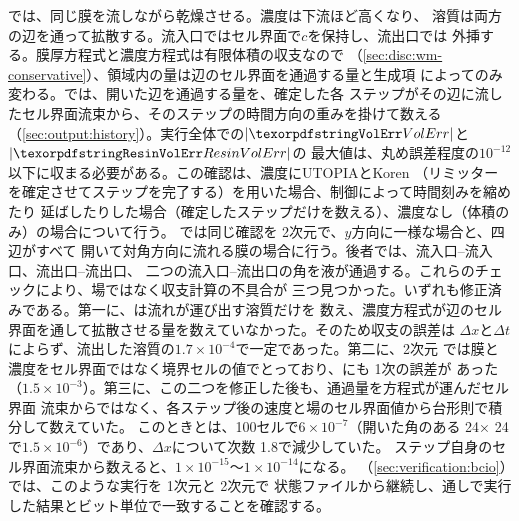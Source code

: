 では、同じ膜を流しながら乾燥させる。濃度は下流ほど高くなり、
溶質は両方の辺を通って拡散する。流入口ではセル界面で$c$を保持し、流出口では
外挿する。膜厚方程式と濃度方程式は有限体積の収支なので
（\cref{sec:disc:wm-conservative}）、領域内の量は辺のセル界面を通過する量と生成項
によってのみ変わる。では、開いた辺を通過する量を、確定した各
ステップがその辺に流したセル界面流束から、そのステップの時間方向の重みを掛けて数える
（\cref{sec:output:history}）。実行全体での$|\code{VolErr}|$と$|\code{ResinVolErr}|$の
最大値は、丸め誤差程度の$10^{-12}$以下に収まる必要がある。この確認は、濃度にUTOPIAとKoren
（リミッターを確定させてステップを完了する）を用いた場合、制御によって時間刻みを縮めたり
延ばしたりした場合（確定したステップだけを数える）、濃度なし（体積のみ）の場合について行う。
では同じ確認を 2次元で、$y$方向に一様な場合と、四辺がすべて
開いて対角方向に流れる膜の場合に行う。後者では、流入口--流入口、流出口--流出口、
二つの流入口--流出口の角を液が通過する。これらのチェックにより、場ではなく収支計算の不具合が
三つ見つかった。いずれも修正済みである。第一に、は流れが運び出す溶質だけを
数え、濃度方程式が辺のセル界面を通して拡散させる量を数えていなかった。そのため収支の誤差は
$\Delta x$と$\Delta t$によらず、流出した溶質の$1.7\times10^{-4}$で一定であった。第二に、2次元
では膜と濃度をセル界面ではなく境界セルの値でとっており、にも 1次の誤差が
あった（$1.5\times10^{-3}$）。第三に、この二つを修正した後も、通過量を方程式が運んだセル界面
流束からではなく、各ステップ後の速度と場のセル界面値から台形則で積分して数えていた。
このときとは、100セルで$6\times10^{-7}$（開いた角のある
24× 24で$1.5\times10^{-6}$）であり、$\Delta x$について次数 1.8で減少していた。
ステップ自身のセル界面流束から数えると、$1\times10^{-15}$〜$1\times10^{-14}$になる。
（\cref{sec:verification:bcio}）では、このような実行を 1次元と 2次元で
状態ファイルから継続し、通しで実行した結果とビット単位で一致することを確認する。

